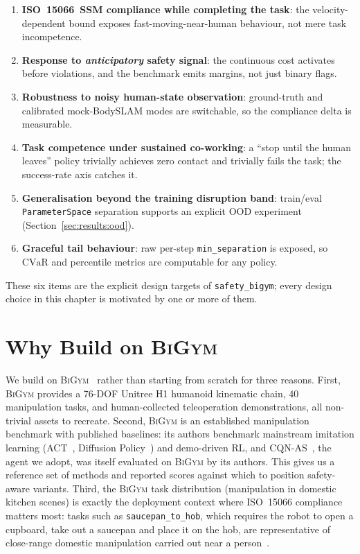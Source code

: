 \documentclass[11pt,a4paper]{report}
\newcommand{\ssm}{SSM}
\newcommand{\iso}{ISO~15066}
\newcommand{\cvar}{\ensuremath{\mathrm{CVaR}}}
\newcommand{\bigym}{\textsc{BiGym}}
\newcommand{\sbigym}{\texttt{safety\_bigym}}
\newcommand{\cqnas}{CQN-AS}
\newcommand{\bodyslampp}{BodySLAM\nolinebreak[4]\hspace{-.05em}\raisebox{.2ex}{\scriptsize ++}}
\begin{document}
\begin{enumerate}[topsep=2pt,itemsep=2pt]
\item \textbf{\iso{}~\ssm{} compliance while completing the task}:
  the velocity-dependent bound exposes fast-moving-near-human
  behaviour, not mere task incompetence.
\item \textbf{Response to \emph{anticipatory} safety signal}: the
  continuous cost activates before violations, and the benchmark
  emits margins, not just binary flags.
\item \textbf{Robustness to noisy human-state observation}:
  ground-truth and calibrated mock-\bodyslampp{} modes are
  switchable, so the compliance delta is measurable.
\item \textbf{Task competence under sustained co-working}: a ``stop
  until the human leaves'' policy trivially achieves zero contact
  and trivially fails the task; the success-rate axis catches it.
\item \textbf{Generalisation beyond the training disruption band}:
  train/eval \texttt{ParameterSpace} separation supports an explicit
  OOD experiment (Section~\ref{sec:results:ood}).
\item \textbf{Graceful tail behaviour}: raw per-step
  \texttt{min\_separation} is exposed, so \cvar{} and percentile
  metrics are computable for any policy.
\end{enumerate}

These six items are the explicit design targets of \sbigym{}; every
design choice in this chapter is motivated by one or more of them.

\section{Why Build on \bigym{}}
\label{sec:bench:why-bigym}

We build on \bigym{}~\cite{chernyadev2024bigym} rather than
starting from scratch for three reasons. First, \bigym{} provides
a 76-DOF Unitree H1 humanoid kinematic chain, 40 manipulation
tasks, and human-collected teleoperation demonstrations, all
non-trivial assets to recreate. Second, \bigym{} is an established
manipulation benchmark with published baselines: its authors
benchmark mainstream imitation learning (ACT~\cite{zhao2023act},
Diffusion Policy~\cite{chi2023diffusion}) and demo-driven RL, and
\cqnas{}~\cite{seo2024cqnas}, the agent we adopt, was itself
evaluated on \bigym{} by its authors. This gives us a reference set
of methods and reported scores against which to position
safety-aware variants. Third, the \bigym{} task distribution
(manipulation in domestic kitchen scenes) is exactly the deployment
context where \iso{} compliance matters most: tasks such as
\texttt{saucepan\_to\_hob}, which requires the robot to open a
cupboard, take out a saucepan and place it on the hob, are
representative of close-range domestic manipulation carried out near
a person~\cite{chernyadev2024bigym}.
\end{document}
